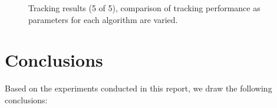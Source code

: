 \begin{figure}[t]
								\caption{Tracking results (5 of 5), comparison of tracking performance as parameters for each algorithm are varied.}
								\label{fig:results_final_5_configs}
								\end{figure}


\section{Conclusions}
Based on the experiments conducted in this report, we draw the following conclusions:

